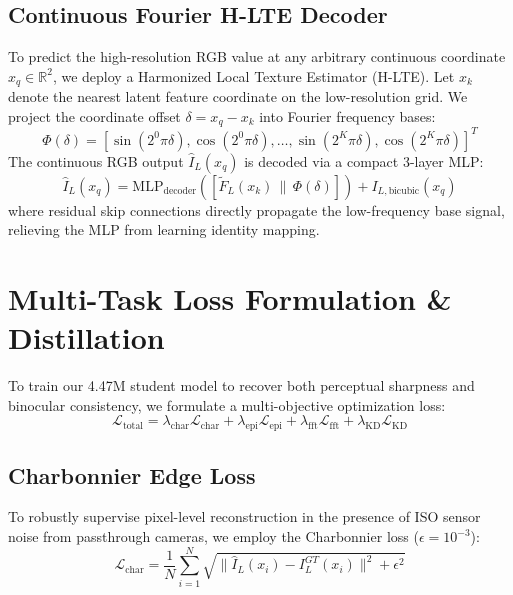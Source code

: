\documentclass[conference]{IEEEtran}
\begin{document}
\subsection{Continuous Fourier H-LTE Decoder}
To predict the high-resolution RGB value at any arbitrary continuous coordinate $x_q \in \mathbb{R}^2$, we deploy a Harmonized Local Texture Estimator (H-LTE). Let $x_k$ denote the nearest latent feature coordinate on the low-resolution grid. We project the coordinate offset $\delta = x_q - x_k$ into Fourier frequency bases:
\begin{equation}
    \Phi(\delta) = \left[ \sin(2^0 \pi \delta), \cos(2^0 \pi \delta), \dots, \sin(2^K \pi \delta), \cos(2^K \pi \delta) \right]^T
\end{equation}
The continuous RGB output $\hat{I}_L(x_q)$ is decoded via a compact 3-layer MLP:
\begin{equation}
    \hat{I}_L(x_q) = \text{MLP}_{\text{decoder}}\left( \left[ \tilde{F}_L(x_k) \,\|\, \Phi(\delta) \right] \right) + I_{L,\text{bicubic}}(x_q)
    \label{eq:inr_decode}
\end{equation}
where residual skip connections directly propagate the low-frequency base signal, relieving the MLP from learning identity mapping.

\section{Multi-Task Loss Formulation \& Distillation}
\label{sec:losses}
To train our 4.47M student model to recover both perceptual sharpness and binocular consistency, we formulate a multi-objective optimization loss:
\begin{equation}
    \mathcal{L}_{\text{total}} = \lambda_{\text{char}} \mathcal{L}_{\text{char}} + \lambda_{\text{epi}} \mathcal{L}_{\text{epi}} + \lambda_{\text{fft}} \mathcal{L}_{\text{fft}} + \lambda_{\text{KD}} \mathcal{L}_{\text{KD}}
    \label{eq:total_loss}
\end{equation}

\subsection{Charbonnier Edge Loss}
To robustly supervise pixel-level reconstruction in the presence of ISO sensor noise from passthrough cameras, we employ the Charbonnier loss ($\epsilon = 10^{-3}$):
\begin{equation}
    \mathcal{L}_{\text{char}} = \frac{1}{N} \sum_{i=1}^N \sqrt{\|\hat{I}_L(x_i) - I_L^{GT}(x_i)\|^2 + \epsilon^2}
\end{equation}
\end{document}
